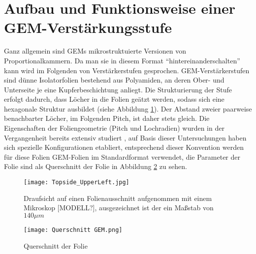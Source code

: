 \section{Aufbau und Funktionsweise einer GEM-Verstärkungsstufe} 
Ganz allgemein sind GEMs mikrostruktuierte Versionen von Proportionalkammern. Da man sie in diesem Format \enquote{hintereinanderschalten} kann wird im Folgenden von Verstärkerstufen gesprochen. GEM-Verstärkerstufen sind dünne Isolatorfolien bestehend aus Polyamiden, an deren Ober- und Unterseite je eine Kupferbeschichtung anliegt. Die Strukturierung der Stufe erfolgt dadurch, dass Löcher in die Folien geätzt werden, sodass sich eine hexagonale Struktur ausbildet (siehe Abbildung \ref{fig:Draufsicht}). Der Abstand zweier paarweise benachbarter Löcher, im Folgenden Pitch, ist daher stets gleich. Die Eigenschaften der Foliengeometrie (Pitch und Lochradien) wurden in der Vergangenheit bereits extensiv studiert \cite{Sauli_Übersicht}, auf Basis dieser Untersuchungen haben sich spezielle Konfigurationen etabliert, entsprechend dieser Konvention werden für diese Folien GEM-Folien im Standardformat verwendet, die Parameter der Folie sind als Querschnitt der Folie in Abbildung \ref{fig:Querschnitt} zu sehen.

	\begin{figure}[h]
		\centering
		\texttt{[image: Topside\_UpperLeft.jpg]}
		\caption{Draufsicht auf einen Folienausschnitt aufgenommen mit einem Mikroskop [MODELL?], ausgezeichnet ist der ein Maßstab von $140 \si{\mu m}$}
		\label{fig:Draufsicht}
	\end{figure}

	\begin{figure}[h]
		\centering
		\texttt{[image: Querschnitt GEM.png]}
		\caption{Querschnitt der Folie}
		\label{fig:Querschnitt}
	\end{figure}
		
		
		
